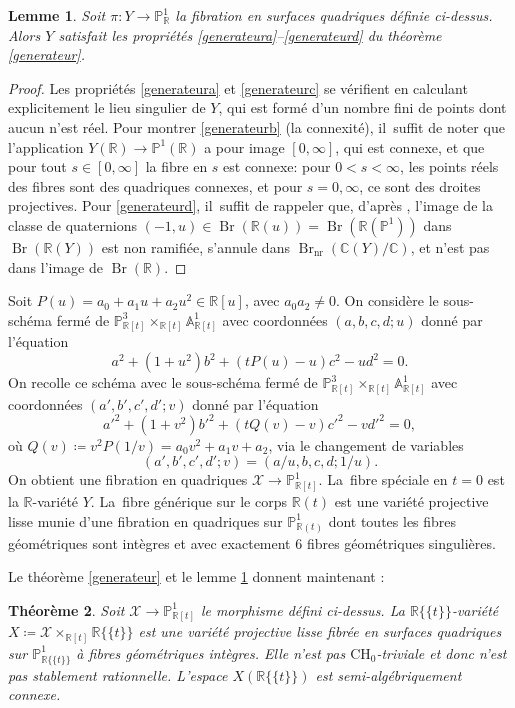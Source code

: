 \documentclass[11pt]{article}
\newcommand{\CH}{\mathrm{CH}}
\newtheorem{thm}{Théorème}[section]
\newtheorem{lemma}[thm]{Lemme}
\theoremstyle{definition}
\newcommand{\C}{\mathbb C}
\newcommand{\R}{\mathbb R}
\newcommand{\A}{\mathbb A}
\renewcommand{\P}{\mathbb P}
\newcommand{\Br}{\operatorname{Br}}
\newcommand{\mc}[1]{\mathcal{#1}}
\newcommand{\on}[1]{\operatorname{#1}}
\newcommand{\puiseux}{\mathbb{R}\{\!\{t\}\!\}}
\begin{document}
\begin{lemma}\label{refX}
Soit $\pi \colon Y \to \P^1_{\R}$ la fibration en surfaces quadriques définie ci-dessus. Alors $Y$ satisfait les propriétés \eqref{generateura}--\eqref{generateurd} du théorème \ref{generateur}.
\end{lemma}
\begin{proof}
Les propriétés \eqref{generateura} et \eqref{generateurc} se vérifient en calculant explicitement le lieu singulier de $Y$, qui est formé d'un nombre fini de points dont aucun n'est réel. Pour montrer \eqref{generateurb} (la connexité), il~suffit de noter que l'application $Y(\R) \to \P^1(\R)$ a pour image $[0,\infty]$, qui est connexe, et que pour tout $s\in [0,\infty]$ la fibre en $s$ est connexe: pour $0<s<\infty$, les points réels des fibres sont des quadriques connexes, et pour $s=0,\infty$, ce sont des droites projectives. Pour \eqref{generateurd}, il~suffit de rappeler que, d'après \cite[Prop.\,13.1]{colliot2024certaines}, l'image de la classe de quaternions $(-1,u) \in \Br(\R(u))=\Br(\R(\P^1))$ dans $\Br(\R(Y))$ est non ramifiée, s'annule dans $\Br_{\on{nr}}(\C(Y)/\C)$, et n'est pas dans l'image de $\Br(\R)$.
\end{proof}

Soit $P(u)=a_0 + a_1u + a_2 u^2 \in \R[u]$, avec $a_0a_2\neq 0$.
On considère le sous-schéma fermé de $\P^3_{\R[t]} \times_{\R[t]} \A^1_{\R[t]}$ avec coordonnées $(a,b,c,d;u)$ donné par l'équation
\[a^2+(1+u^2)b^2 + (tP(u)- u)c^2 -ud^2=0.\]
On recolle ce schéma avec le sous-schéma fermé de $\P^3_{\R[t]} \times_{\R[t]} \A^1_{\R[t]}$ avec coordonnées $(a',b',c',d';v)$
donné par l'équation
\[a'^2+(1+v^2)b'^2 + (tQ(v)-v)c'^2 -vd'^2=0,\]
où $Q(v)\coloneqq v^2P(1/v)= a_0v^2 + a_1v + a_2$, via le changement de variables
\[(a',b',c',d';v)=(a/u, b, c, d; 1/u).\]
On obtient une fibration en quadriques $\mc{X} \to \P^1_{\R[t]}$. La~fibre spéciale en $t=0$ est la $\R$-variété $Y$. La~fibre générique sur le corps $\R(t)$
est une variété projective lisse munie d'une fibration en quadriques sur $\P^1_{\R(t)}$ dont toutes les fibres géométriques sont intègres et avec exactement $6$ fibres géométriques singulières.

Le théorème \ref{generateur} et le lemme \ref{refX} donnent maintenant :
\begin{thm}\label{prop-fibre-quadriques}
Soit $\mc{X}\to \P^1_{\R[t]}$ le morphisme défini ci-dessus.
La $\puiseux$-variété $X\coloneqq \mc{X}\times_{\R[t]} \puiseux$ est une variété projective lisse fibrée en surfaces quadriques sur $\P^1_{\puiseux}$ à fibres géométriques intègres. Elle n'est pas $\CH_0$-triviale et donc n'est pas stablement rationnelle. L'espace $X(\puiseux)$ est semi-algébriquement connexe.
\end{thm}
\end{document}

